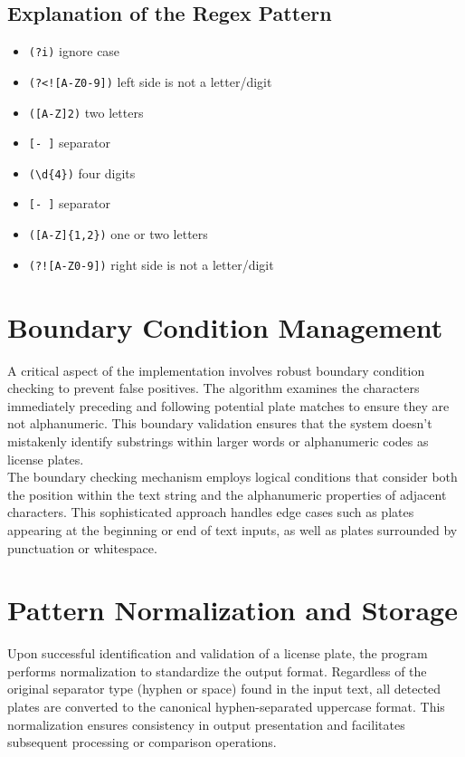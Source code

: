 \documentclass[12pt,a4paper]{article}
\begin{document}
\subsection{Explanation of the Regex Pattern}
\begin{itemize}
    \item \texttt{(?i)} ignore case
    \item \texttt{(?<![A-Z0-9])} left side is not a letter/digit
    \item \texttt{([A-Z]{2})} two letters
    \item \texttt{[- ]} separator
    \item \texttt{(\textbackslash d\{4\})} four digits
    \item \texttt{[- ]} separator
    \item \texttt{([A-Z]\{1,2\})} one or two letters
    \item \texttt{(?![A-Z0-9])} right side is not a letter/digit
\end{itemize}

\section{Boundary Condition Management}

A critical aspect of the implementation involves robust boundary condition checking to prevent false positives. The algorithm examines the characters immediately preceding and following potential plate matches to ensure they are not alphanumeric. This boundary validation ensures that the system doesn't mistakenly identify substrings within larger words or alphanumeric codes as license plates.\\[6pt]

\noindent The boundary checking mechanism employs logical conditions that consider both the position within the text string and the alphanumeric properties of adjacent characters. This sophisticated approach handles edge cases such as plates appearing at the beginning or end of text inputs, as well as plates surrounded by punctuation or whitespace.

\section{Pattern Normalization and Storage}

Upon successful identification and validation of a license plate, the program performs normalization to standardize the output format. Regardless of the original separator type (hyphen or space) found in the input text, all detected plates are converted to the canonical hyphen-separated uppercase format. This normalization ensures consistency in output presentation and facilitates subsequent processing or comparison operations.\\[6pt]
\end{document}
